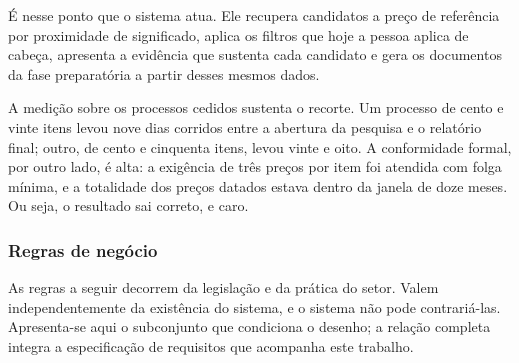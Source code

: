 É nesse ponto que o sistema atua. Ele recupera candidatos a preço de referência
por proximidade de significado, aplica os filtros que hoje a pessoa aplica de
cabeça, apresenta a evidência que sustenta cada candidato e gera os documentos
da fase preparatória a partir desses mesmos dados.

A medição sobre os processos cedidos sustenta o recorte. Um processo de cento e
vinte itens levou nove dias corridos entre a abertura da pesquisa e o relatório
final; outro, de cento e cinquenta itens, levou vinte e oito. A conformidade
formal, por outro lado, é alta: a exigência de três preços por item foi atendida
com folga mínima, e a totalidade dos preços datados estava dentro da janela de
doze meses. Ou seja, o resultado sai correto, e caro.


\subsubsection{Regras de negócio}
\label{subsec:regras-de-negocio}

As regras a seguir decorrem da legislação e da prática do setor. Valem
independentemente da existência do sistema, e o sistema não pode contrariá-las.
Apresenta-se aqui o subconjunto que condiciona o desenho; a relação completa
integra a especificação de requisitos que acompanha este trabalho.

